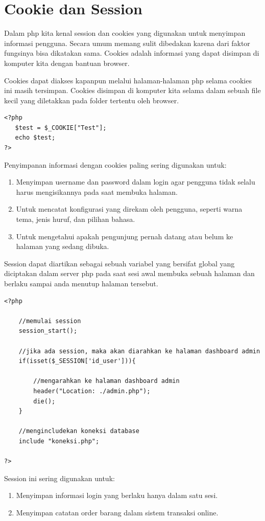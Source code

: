\section{Cookie dan Session}
Dalam php kita kenal session dan cookies yang digunakan untuk menyimpan informasi pengguna. Secara umum memang sulit dibedakan karena dari faktor fungsinya bisa dikatakan sama. Cookies adalah informasi yang dapat disimpan di komputer kita dengan bantuan browser. 
\par 
Cookies dapat diakses kapanpun melalui halaman-halaman php selama cookies ini masih tersimpan. Cookies disimpan di komputer kita selama dalam sebuah file kecil yang diletakkan pada folder tertentu oleh browser. 
\begin{lstlisting}
<?php
   $test = $_COOKIE["Test"];
   echo $test;
?> 
\end{lstlisting}
Penyimpanan informasi dengan cookies paling sering digunakan untuk:
\begin{enumerate}
\item Menyimpan username dan password dalam login agar pengguna tidak selalu harus mengisikannya pada saat membuka halaman.
\item Untuk mencatat konfigurasi yang direkam oleh pengguna, seperti warna tema, jenis huruf, dan pilihan bahasa.
\item Untuk mengetahui apakah pengunjung pernah datang atau belum ke halaman yang sedang dibuka.
\end{enumerate}
Session dapat diartikan sebagai sebuah variabel yang bersifat global yang diciptakan dalam server php pada saat sesi awal membuka sebuah halaman dan berlaku sampai anda menutup halaman tersebut.
\begin{lstlisting}
<?php

    //memulai session
    session_start();

    //jika ada session, maka akan diarahkan ke halaman dashboard admin
    if(isset($_SESSION['id_user'])){

        //mengarahkan ke halaman dashboard admin
        header("Location: ./admin.php");
        die();
    }

    //mengincludekan koneksi database
    include "koneksi.php";

?> 
\end{lstlisting}
Session ini sering digunakan untuk:
\begin{enumerate}
\item Menyimpan informasi login yang berlaku hanya dalam satu sesi.
\item Menyimpan catatan order barang dalam sistem transaksi online.
\end{enumerate}